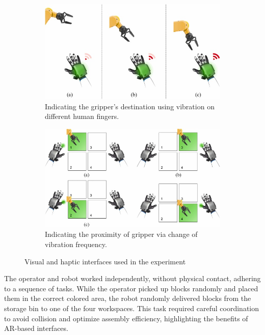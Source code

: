    \begin{figure}[htp]
        \centering
        \begin{subfigure}{.49\textwidth}
            \centering
            \includegraphics[width=0.9\linewidth]{figs/haptic-cues.jpg}
            \caption{Indicating the gripper’s destination using vibration on different human fingers.}
            \label{fig:sfig1}
        \end{subfigure}%
        \begin{subfigure}{.49\textwidth}
            \centering
            \includegraphics[width=0.9\linewidth]{figs/visual-cues.jpg}
            \caption{Indicating the proximity of gripper via change of vibration frequency.}
            \label{fig:sfig2}
        \end{subfigure}
        \caption{Visual and haptic interfaces used in the experiment \cite{CHU2023313}}
        \label{fig:haptic-visual-cues}
    \end{figure}


    The operator and robot worked independently, without physical contact, adhering to a sequence of tasks. While the operator picked up blocks randomly and placed them in the correct colored area, the robot randomly delivered blocks from the storage bin to one of the four workspaces. This task required careful coordination to avoid collision and optimize assembly efficiency, highlighting the benefits of \ac{AR}-based interfaces.

